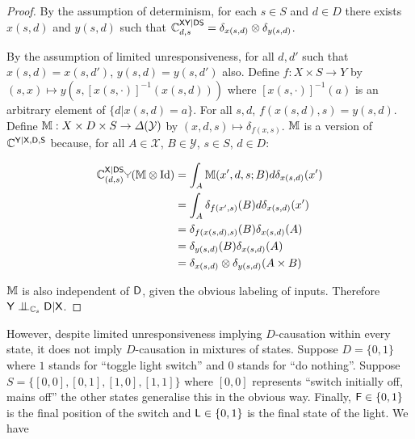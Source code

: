 \begin{proof}
By the assumption of determinism, for each $s\in S$ and $d\in D$ there exists $x(s,d)$ and $y(s,d)$ such that $\mathbb{C}^{\mathsf{X}\mathsf{Y}|\mathsf{D}\mathsf{S}}_{d,s} = \delta_{x(s,d)}\otimes\delta_{y(s,d)}$.

By the assumption of limited unresponsiveness, for all $d,d'$ such that $x(s,d)=x(s,d')$, $y(s,d)=y(s,d')$ also. Define $f:X\times S\to Y$ by $(s,x)\mapsto y(s,[x(s,\cdot)]^{-1}(x(s,d)))$ where $[x(s,\cdot)]^{-1}(a)$ is an arbitrary element of $\{d|x(s,d)=a\}$. For all $s,d$, $f(x(s,d),s)=y(s,d)$. Define $\mathbb{M}:X\times D\times S\to \Delta(\mathcal{Y})$ by $(x,d,s)\mapsto \delta_{f(x,s)}$. $\mathbb{M}$ is a version of $\mathbb{C}^{\mathsf{Y}|\mathsf{X},\mathsf{D},\mathsf{S}}$ because, for all $A\in \mathcal{X}$, $B\in \mathcal{Y}$, $s\in S$, $d\in D$:

\begin{align}
    \kernel{C}^{\RV{X}|\RV{D}\RV{S}}_{(d,s)}\splitter{0.1}(\kernel{M}\otimes\mathrm{Id}) &= \int_A \kernel{M}(x',d,s;B) d\delta_{x(s,d)}(x') \\
                                                                                        &= \int_A \delta_{f(x',s)}(B) d\delta_{x(s,d)}(x') \\
                                                                                        &= \delta_{f(x(s,d),s)}(B)\delta_{x(s,d)}(A) \\
                                                                                        &= \delta_{y(s,d)}(B)\delta_{x(s,d)}(A)\\
                                                                                        &= \delta_{x(s,d)}\otimes\delta_{y(s,d)}(A\times B)
\end{align}

$\mathbb{M}$ is also independent of $\mathsf{D}$, given the obvious labeling of inputs. Therefore $\RV{Y}\CI_{\kernel{C}_s}\RV{D}|\RV{X}$.
\end{proof}

However, despite limited unresponsiveness implying $D$-causation within every state, it does not imply $D$-causation in mixtures of states. Suppose $D=\{0,1\}$ where $1$ stands for ``toggle light switch'' and $0$ stands for ``do nothing''. Suppose $S=\{[0,0],[0,1],[1,0],[1,1]\}$ where $[0,0]$ represents ``switch initially off, mains off'' the other states generalise this in the obvious way. Finally, $\mathsf{F}\in\{0,1\}$ is the final position of the switch and $\mathsf{L}\in\{0,1\}$ is the final state of the light. We have

